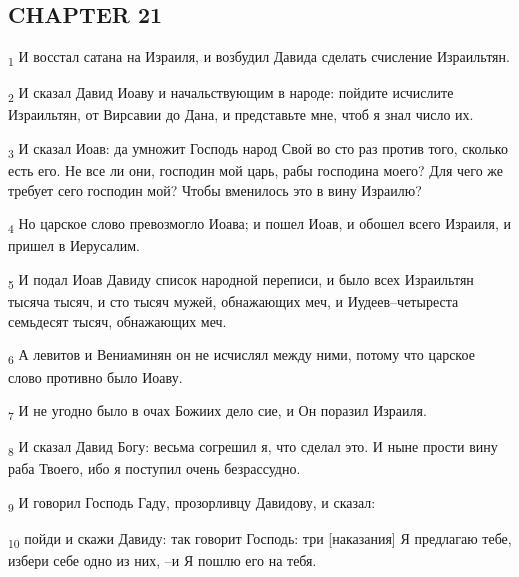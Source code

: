 \subsection{CHAPTER 21}
\begin{tcolorbox}
\textsubscript{1} И восстал сатана на Израиля, и возбудил Давида сделать счисление Израильтян.
\end{tcolorbox}
\begin{tcolorbox}
\textsubscript{2} И сказал Давид Иоаву и начальствующим в народе: пойдите исчислите Израильтян, от Вирсавии до Дана, и представьте мне, чтоб я знал число их.
\end{tcolorbox}
\begin{tcolorbox}
\textsubscript{3} И сказал Иоав: да умножит Господь народ Свой во сто раз против того, сколько есть его. Не все ли они, господин мой царь, рабы господина моего? Для чего же требует сего господин мой? Чтобы вменилось это в вину Израилю?
\end{tcolorbox}
\begin{tcolorbox}
\textsubscript{4} Но царское слово превозмогло Иоава; и пошел Иоав, и обошел всего Израиля, и пришел в Иерусалим.
\end{tcolorbox}
\begin{tcolorbox}
\textsubscript{5} И подал Иоав Давиду список народной переписи, и было всех Израильтян тысяча тысяч, и сто тысяч мужей, обнажающих меч, и Иудеев--четыреста семьдесят тысяч, обнажающих меч.
\end{tcolorbox}
\begin{tcolorbox}
\textsubscript{6} А левитов и Вениаминян он не исчислял между ними, потому что царское слово противно было Иоаву.
\end{tcolorbox}
\begin{tcolorbox}
\textsubscript{7} И не угодно было в очах Божиих дело сие, и Он поразил Израиля.
\end{tcolorbox}
\begin{tcolorbox}
\textsubscript{8} И сказал Давид Богу: весьма согрешил я, что сделал это. И ныне прости вину раба Твоего, ибо я поступил очень безрассудно.
\end{tcolorbox}
\begin{tcolorbox}
\textsubscript{9} И говорил Господь Гаду, прозорливцу Давидову, и сказал:
\end{tcolorbox}
\begin{tcolorbox}
\textsubscript{10} пойди и скажи Давиду: так говорит Господь: три [наказания] Я предлагаю тебе, избери себе одно из них, --и Я пошлю его на тебя.
\end{tcolorbox}
